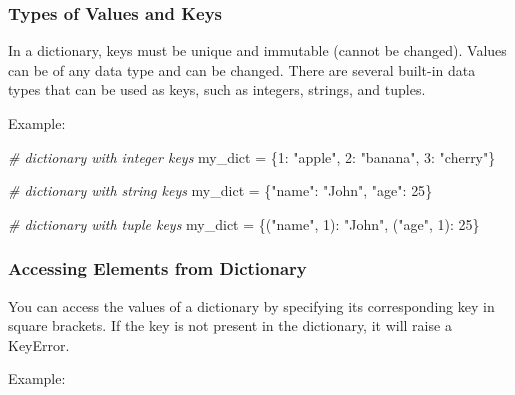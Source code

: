 \documentclass[11pt]{article}
\newenvironment{Shaded}{}{}
\newcommand{\DecValTok}[1]{\textcolor[rgb]{0.25,0.63,0.44}{{#1}}}
\newcommand{\StringTok}[1]{\textcolor[rgb]{0.25,0.44,0.63}{{#1}}}
\newcommand{\CommentTok}[1]{\textcolor[rgb]{0.38,0.63,0.69}{\textit{{#1}}}}
\newcommand{\NormalTok}[1]{{#1}}
\newcommand{\OperatorTok}[1]{\textcolor[rgb]{0.40,0.40,0.40}{{#1}}}
\begin{document}
\hypertarget{types-of-values-and-keys}{%
\subsubsection{Types of Values and
Keys}\label{types-of-values-and-keys}}

In a dictionary, keys must be unique and immutable (cannot be changed).
Values can be of any data type and can be changed. There are several
built-in data types that can be used as keys, such as integers, strings,
and tuples.

Example:

\begin{Shaded}
\begin{Highlighting}[]
\CommentTok{\# dictionary with integer keys}
\NormalTok{my\_dict }\OperatorTok{=}\NormalTok{ \{}\DecValTok{1}\NormalTok{: }\StringTok{"apple"}\NormalTok{, }\DecValTok{2}\NormalTok{: }\StringTok{"banana"}\NormalTok{, }\DecValTok{3}\NormalTok{: }\StringTok{"cherry"}\NormalTok{\}}

\CommentTok{\# dictionary with string keys}
\NormalTok{my\_dict }\OperatorTok{=}\NormalTok{ \{}\StringTok{"name"}\NormalTok{: }\StringTok{"John"}\NormalTok{, }\StringTok{"age"}\NormalTok{: }\DecValTok{25}\NormalTok{\}}

\CommentTok{\# dictionary with tuple keys}
\NormalTok{my\_dict }\OperatorTok{=}\NormalTok{ \{(}\StringTok{"name"}\NormalTok{, }\DecValTok{1}\NormalTok{): }\StringTok{"John"}\NormalTok{, (}\StringTok{"age"}\NormalTok{, }\DecValTok{1}\NormalTok{): }\DecValTok{25}\NormalTok{\}}
\end{Highlighting}
\end{Shaded}

\hypertarget{accessing-elements-from-dictionary}{%
\subsubsection{Accessing Elements from
Dictionary}\label{accessing-elements-from-dictionary}}

You can access the values of a dictionary by specifying its
corresponding key in square brackets. If the key is not present in the
dictionary, it will raise a KeyError.

Example:
\end{document}
